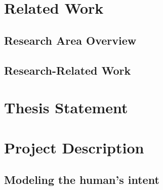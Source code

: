 \documentclass[phd]{byuprop}
\begin{document}




\section{Related Work}

\subsection{Research Area Overview}


\subsection{Research-Related Work}




\section{Thesis Statement}

\section{Project Description}

\subsection{Modeling the human's intent}
\end{document}
